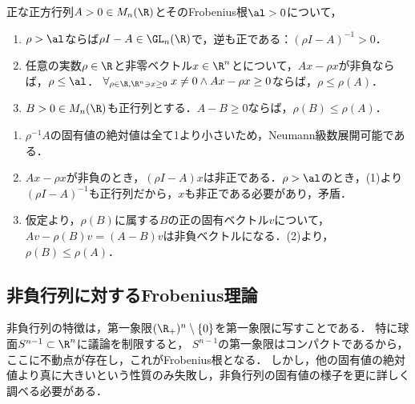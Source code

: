 \documentclass[uplatex, dvipdfmx]{jsreport}
\begin{document}
\begin{proposition}[非負であるということが定める順序関係はスペクトル半径の大小関係に等しい]
    正な正方行列$A>0\in M_n(\R)$とそのFrobenius根$\al>0$について，
    \begin{enumerate}
        \item $\rho>\al$ならば$\rho I-A\in\GL_n(\R)$で，逆も正である：$(\rho I-A)^{-1}>0$．
        \item 任意の実数$\rho\in\R$と非零ベクトル$x\in\R^n$とについて，$Ax-\rho x$が非負ならば，$\rho\le\al$．
        $\forall_{\rho\in\R,\R^n\ni x\ge0}\;x\ne0\land Ax-\rho x\ge0$ならば，$\rho\le\rho(A)$．
        \item $B>0\in M_n(\R)$も正行列とする．$A-B\ge0$ならば，$\rho(B)\le\rho(A)$．
    \end{enumerate}
\end{proposition}
\begin{Proof}\mbox{}
    \begin{enumerate}
        \item $\rho^{-1}A$の固有値の絶対値は全て1より小さいため，Neumann級数展開可能である．
        \item $Ax-\rho x$が非負のとき，$(\rho I-A)x$は非正である．$\rho>\al$のとき，(1)より$(\rho I-A)^{-1}$も正行列だから，$x$も非正である必要があり，矛盾．
        \item 仮定より，$\rho(B)$に属する$B$の正の固有ベクトル$v$について，$Av-\rho(B)v=(A-B)v$は非負ベクトルになる．(2)より，$\rho(B)\le\rho(A)$．
    \end{enumerate}
\end{Proof}

\subsection{非負行列に対するFrobenius理論}

\begin{tcolorbox}[colframe=ForestGreen, colback=ForestGreen!10!white,breakable,colbacktitle=ForestGreen!40!white,coltitle=black,fonttitle=\bfseries\sffamily,
title=]
    非負行列の特徴は，第一象限$(\R_+)^n\setminus\{0\}$を第一象限に写すことである．
    特に球面$S^{n-1}\subset\R^n$に議論を制限すると，
    $S^{n-1}$の第一象限はコンパクトであるから，ここに不動点が存在し，これがFrobenius根となる．
    しかし，他の固有値の絶対値より真に大きいという性質のみ失敗し，非負行列の固有値の様子を更に詳しく調べる必要がある．
\end{tcolorbox}
\end{document}
